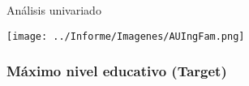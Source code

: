 \documentclass[pdf]{beamer}
\begin{document}
\begin{frame}{Análisis univariado}

    \begin{center}
        \texttt{[image: ../Informe/Imagenes/AUIngFam.png]}
    \end{center}

\end{frame}

           
           
           
 

           
           
           
           
    \subsubsection{Máximo nivel educativo (Target)}
    
\end{document}

